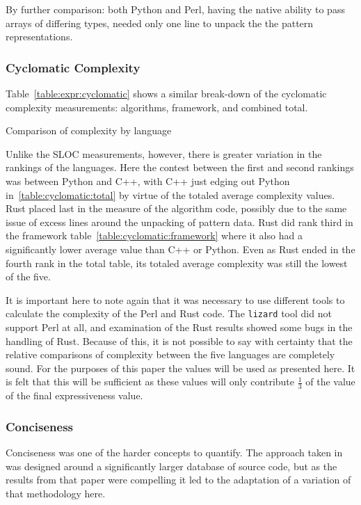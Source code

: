 By further comparison: both Python and Perl, having the native ability to pass arrays of differing types, needed only one line to unpack the the pattern representations.

\subsubsection{Cyclomatic Complexity}

Table~\ref{table:expr:cyclomatic} shows a similar break-down of the cyclomatic complexity measurements: algorithms, framework, and combined total.

\begin{table}[!htb]

\caption{Comparison of complexity by language}
\label{table:expr:cyclomatic}
\end{table}

Unlike the SLOC measurements, however, there is greater variation in the rankings of the languages. Here the contest between the first and second rankings was between Python and C++, with C++ just edging out Python in~\ref{table:cyclomatic:total} by virtue of the totaled average complexity values. Rust placed last in the measure of the algorithm code, possibly due to the same issue of excess lines around the unpacking of pattern data. Rust did rank third in the framework table~\ref{table:cyclomatic:framework} where it also had a significantly lower average value than C++ or Python. Even as Rust ended in the fourth rank in the total table, its totaled average complexity was still the lowest of the five.

It is important here to note again that it was necessary to use different tools to calculate the complexity of the Perl and Rust code. The \texttt{lizard} tool did not support Perl at all, and examination of the Rust results showed some bugs in the handling of Rust. Because of this, it is not possible to say with certainty that the relative comparisons of complexity between the five languages are completely sound. For the purposes of this paper the values will be used as presented here. It is felt that this will be sufficient as these values will only contribute $\frac{1}{3}$ of the value of the final expressiveness value.

\subsubsection{Conciseness}
\label{subsubsec:conciseness}

Conciseness was one of the harder concepts to quantify. The approach taken in~\cite{bergmans} was designed around a significantly larger database of source code, but as the results from that paper were compelling it led to the adaptation of a variation of that methodology here.

